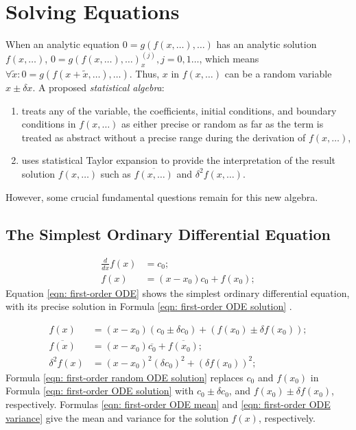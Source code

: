 \documentclass[twoside]{article}
\numberwithin{equation}{section}
\begin{document}
\fi


\section{Solving Equations}
\label{sec: equations}

When an analytic equation $0 = g(f(x, \dots), \dots)$ has an analytic solution $f(x, \dots)$, $0 = g(f(x, \dots), \dots)_x^{(j)}, j = 0,1\dots$, which means $\forall \tilde{x}: 0 = g(f(x + \tilde{x}, \dots), \dots)$.
Thus, $x$ in $f(x, \dots)$ can be a random variable $x \pm \delta x$. 
A proposed \emph{statistical algebra}:
\begin{enumerate}
\item treats any of the variable, the coefficients, initial conditions, and boundary conditions in $f(x, \dots)$ as either precise or random as far as the term is treated as abstract without a precise range during the derivation of $f(x, \dots)$,

\item uses statistical Taylor expansion to provide the interpretation of the result solution $f(x, \dots)$ such as $\overline{f(x, \dots)}$ and $\delta^2 f(x, \dots)$.
\end{enumerate}
 However, some crucial fundamental questions remain for this new algebra.


\subsection{The Simplest Ordinary Differential Equation}

\begin{align}
\label{eqn: first-order ODE}
\frac{d}{d x} f(x) &= c_0; \\
\label{eqn: first-order ODE solution}
f(x) &= (x - x_0) c_0 + f(x_0); 
\end{align}
Equation \eqref{eqn: first-order ODE} shows the simplest ordinary differential equation, with its precise solution in Formula \eqref{eqn: first-order ODE solution} \cite{Numerical_Recipes}.

\begin{align}
\label{eqn: first-order random ODE solution}
f(x) &= (x - x_0) (c_0 \pm \delta c_0) + (f(x_0) \pm \delta f(x_0)); \\
\label{eqn: first-order ODE mean}
\overline{f(x)} &= (x - x_0) \overline{c_0} + \overline{f(x_0)}; \\
\label{eqn: first-order ODE variance}
\delta^2 f(x) &= (x - x_0)^2 (\delta c_0)^2 + (\delta f(x_0))^2;
\end{align}
Formula \eqref{eqn: first-order random ODE solution} replaces $c_0$ and $f(x_0)$ in Formula \eqref{eqn: first-order ODE solution} with $c_0 \pm \delta c_0$, and $f(x_0) \pm \delta f(x_0)$, respectively.
Formulas \eqref{eqn: first-order ODE mean} and \eqref{eqn: first-order ODE variance} give the mean and variance for the solution $f(x)$, respectively.
\end{document}
